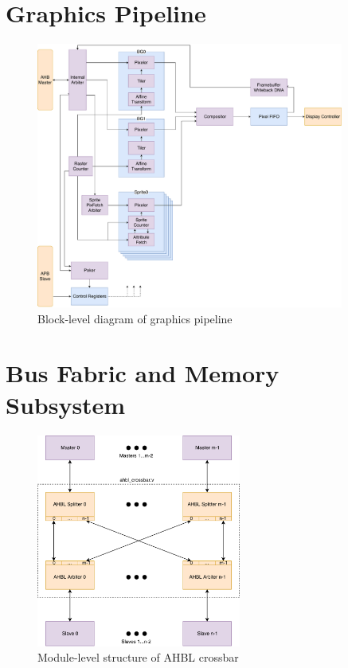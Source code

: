 \documentclass{article}
\begin{document}
\section{Graphics Pipeline}

\begin{figure}[!htb]
\centering
\caption{Block-level diagram of graphics pipeline}
\includegraphics[width=0.9\textwidth]{diagrams/graphics.pdf}
\end{figure}

\section{Bus Fabric and Memory Subsystem}

\begin{figure}[!htb]
\centering
\label{diagram:crossbar_structure}
\caption{Module-level structure of AHBL crossbar}
\includegraphics[width=0.6\textwidth]{diagrams/crossbar_structure.pdf}
\end{figure}
\end{document}

